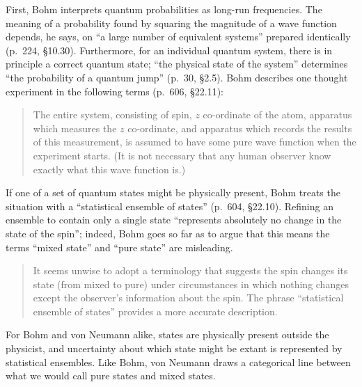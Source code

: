 \documentclass[aps,pra,superscriptaddress,12pt,tightenlines,nofootinbib]{revtex4}
\begin{document}
First, Bohm interprets quantum probabilities as long-run frequencies.
The meaning of a probability found by squaring the magnitude of a wave
function depends, he says, on ``a large number of equivalent systems''
prepared identically (p.\ 224, \S 10.30).  Furthermore, for an
individual quantum system, there is in principle a correct quantum
state; ``the physical state of the system'' determines ``the
probability of a quantum jump'' (p.\ 30, \S 2.5).  Bohm describes one
thought experiment in the following terms (p.\ 606, \S 22.11):
\begin{quotation}
\noindent The entire system, consisting of spin, $z$ co-ordinate of
the atom, apparatus which measures the $z$ co-ordinate, and apparatus
which records the results of this measurement, is assumed to have some
pure wave function when the experiment starts.  (It is not necessary
that any human observer know exactly what this wave function is.)
\end{quotation}
If one of a set of quantum states might be physically present, Bohm
treats the situation with a ``statistical ensemble of states''
(p.\ 604, \S 22.10).  Refining an ensemble to contain only a single
state ``represents absolutely no change in the state of the spin'';
indeed, Bohm goes so far as to argue that this means the terms ``mixed
state'' and ``pure state'' are misleading.
\begin{quotation}
\noindent It seems unwise to adopt a terminology that suggests the
spin changes its state (from mixed to pure) under circumstances in
which nothing changes except the observer's information about the
spin.  The phrase ``statistical ensemble of states'' provides a more
accurate description.
\end{quotation}
For Bohm and von Neumann alike, states are physically present outside
the physicist, and uncertainty about which state might be extant is
represented by statistical ensembles.  Like Bohm, von Neumann draws a
categorical line between what we would call pure states and mixed states.
\end{document}
